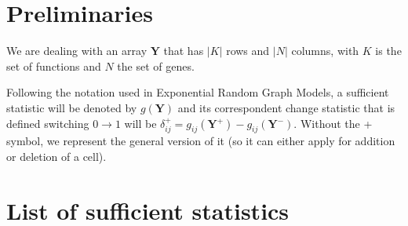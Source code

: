 \documentclass[11pt]{article}
\newcommand{\Y}{\mathbf{Y}{}}
\begin{document}
\section{Preliminaries}

We are dealing with an array $\Y$ that has $|K|$ rows and $|N|$ columns, with $K$ is the set of functions and $N$ the set of genes.

Following the notation used in Exponential Random Graph Models, a sufficient statistic will be denoted by $g(\Y)$ and its correspondent change statistic that is defined switching $0\to1$ will be $\delta_{ij}^+ = g_{ij}(\Y^+) - g_{ij}(\Y^-)$. Without the + symbol, we represent the general version of it (so it can either apply for addition or deletion of a cell).


\section{List of sufficient statistics}
\end{document}
